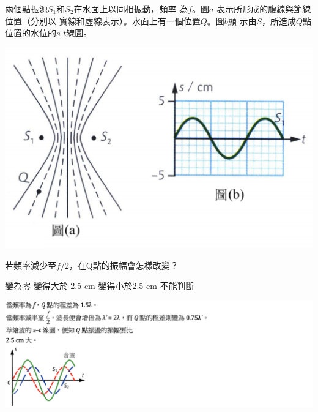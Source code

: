 {
    兩個點振源$S_1$和$S_2$在水面上以同相振動，頻率 為$f$。圖$a$ 表示所形成的腹線與節線位置（分別以 實線和虛線表示）。水面上有一個位置$Q$。圖$b$顯 示由$S$，所造成$Q$點位置的水位的$s$-$t$線圖。
    \par{\par\centering\includegraphics[width=.5\textwidth]{./img/ch3_earlyclass_wave_mc_2024-05-14-13-36-06.png}\par}
    若頻率減少至$f/2$，在Q點的振幅會怎樣改變？
    \begin{tasks}
        \task 變為零
        \task 變得大於 2.5 cm
        \task 變得小於2.5 cm
        \task 不能判斷
    \end{tasks}

}{
    \par{\par\centering\includegraphics[width=\textwidth]{./img/ch3_earlyclass_wave_mc_2024-05-14-13-37-37.png}\par}
}
